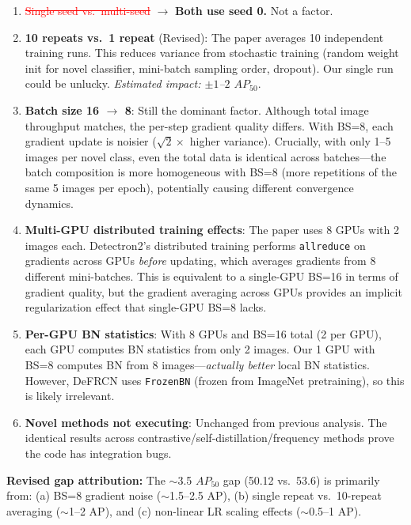 \documentclass[11pt,a4paper]{article}
\begin{document}
\begin{enumerate}
    \item \textcolor{red}{\sout{Single seed vs.\ multi-seed}} $\rightarrow$ \textbf{Both use seed 0.} Not a factor.

    \item \textbf{10 repeats vs.\ 1 repeat} (Revised): The paper averages 10 independent training runs. This reduces variance from stochastic training (random weight init for novel classifier, mini-batch sampling order, dropout). Our single run could be unlucky. \textit{Estimated impact: $\pm 1$--$2$ $AP_{50}$}.

    \item \textbf{Batch size 16 $\rightarrow$ 8}: Still the dominant factor. Although total image throughput matches, the per-step gradient quality differs. With BS=8, each gradient update is noisier ($\sqrt{2}\times$ higher variance). Crucially, with only 1--5 images per novel class, even the total data is identical across batches---the batch composition is more homogeneous with BS=8 (more repetitions of the same 5 images per epoch), potentially causing different convergence dynamics.

    \item \textbf{Multi-GPU distributed training effects}: The paper uses 8 GPUs with 2 images each. Detectron2's distributed training performs \texttt{allreduce} on gradients across GPUs \textit{before} updating, which averages gradients from 8 different mini-batches. This is equivalent to a single-GPU BS=16 in terms of gradient quality, but the gradient averaging across GPUs provides an implicit regularization effect that single-GPU BS=8 lacks.

    \item \textbf{Per-GPU BN statistics}: With 8 GPUs and BS=16 total (2 per GPU), each GPU computes BN statistics from only 2 images. Our 1 GPU with BS=8 computes BN from 8 images---\textit{actually better} local BN statistics. However, DeFRCN uses \texttt{FrozenBN} (frozen from ImageNet pretraining), so this is likely irrelevant.

    \item \textbf{Novel methods not executing}: Unchanged from previous analysis. The identical results across contrastive/self-distillation/frequency methods prove the code has integration bugs.
\end{enumerate}

\textbf{Revised gap attribution:} The $\sim$3.5 $AP_{50}$ gap (50.12 vs.\ 53.6) is primarily from: (a) BS=8 gradient noise ($\sim$1.5--2.5 AP), (b) single repeat vs.\ 10-repeat averaging ($\sim$1--2 AP), and (c) non-linear LR scaling effects ($\sim$0.5--1 AP).
\end{document}
